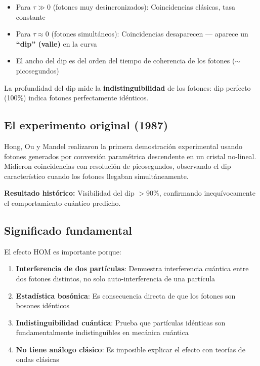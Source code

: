 \documentclass[11pt,a4paper,spanish]{book}
\begin{document}
\begin{itemize}
	\item Para $\tau \gg 0$ (fotones muy desincronizados): Coincidencias clásicas, tasa constante
	\item Para $\tau \approx 0$ (fotones simultáneos): Coincidencias desaparecen — aparece un \textbf{``dip'' (valle)} en la curva
	\item El ancho del dip es del orden del tiempo de coherencia de los fotones ($\sim$ picosegundos)
\end{itemize}

La profundidad del dip mide la \textbf{indistinguibilidad} de los fotones: dip perfecto (100\%) indica fotones perfectamente idénticos.

\subsection*{El experimento original (1987)}

Hong, Ou y Mandel \cite{hong1987} realizaron la primera demostración experimental usando fotones generados por conversión paramétrica descendente en un cristal no-lineal. Midieron coincidencias con resolución de picosegundos, observando el dip característico cuando los fotones llegaban simultáneamente.

\textbf{Resultado histórico:} Visibilidad del dip $>90\%$, confirmando inequívocamente el comportamiento cuántico predicho.

\subsection*{Significado fundamental}

El efecto HOM es importante porque:

\begin{enumerate}
	\item \textbf{Interferencia de dos partículas}: Demuestra interferencia cuántica entre dos fotones distintos, no solo auto-interferencia de una partícula
	\item \textbf{Estadística bosónica}: Es consecuencia directa de que los fotones son bosones idénticos
	\item \textbf{Indistinguibilidad cuántica}: Prueba que partículas idénticas son fundamentalmente indistinguibles en mecánica cuántica
	\item \textbf{No tiene análogo clásico}: Es imposible explicar el efecto con teorías de ondas clásicas
\end{enumerate}
\end{document}
